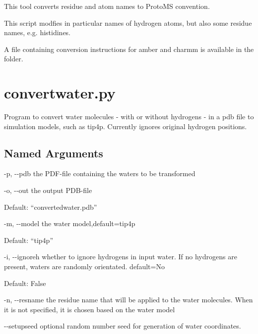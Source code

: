 \documentclass[letterpaper,10pt,english]{sphinxmanual}
\begin{document}

This tool converts residue and atom names to ProtoMS convention.

This script modfies in particular names of hydrogen atoms, but also some residue names, e.g. histidines.

A file containing conversion instructions for amber and charmm is available in the  folder.


\section{convertwater.py}
\label{\detokenize{tools:convertwater-py}}

Program to convert water molecules - with or without hydrogens - in a pdb file to simulation models, such as tip4p. Currently ignores original hydrogen positions.


%
\begin{sphinxVerbatim}[commandchars=\\\{\}]
  \PYG{p}{[}\PYG{p}{]} \PYG{p}{[} \PYG{p}{]} \PYG{p}{[} \PYG{p}{]} \PYG{p}{[} \PYG{p}{]} \PYG{p}{[}\PYG{p}{]} \PYG{p}{[} \PYG{p}{]}
                       \PYG{p}{[} \PYG{p}{]}
\end{sphinxVerbatim}


\subsection{Named Arguments}
\label{\detokenize{tools:Named Arguments}}\begin{optionlist}{3cm}
\item [-p, -{-}pdb]  
the PDF-file containing the waters to be transformed
\item [-o, -{-}out]  
the output PDB-file

Default: “convertedwater.pdb”
\item [-m, -{-}model]  
the water model,default=tip4p

Default: “tip4p”
\item [-i, -{-}ignoreh]  
whether to ignore hydrogens in input water. If no hydrogens are present, waters are randomly orientated. default=No

Default: False
\item [-n, -{-}resname]  
the residue name that will be applied to the water molecules. When it is not specified, it is chosen based on the water model
\item [-{-}setupseed]  
optional random number seed for generation of water coordinates.
\end{optionlist}
\end{document}
